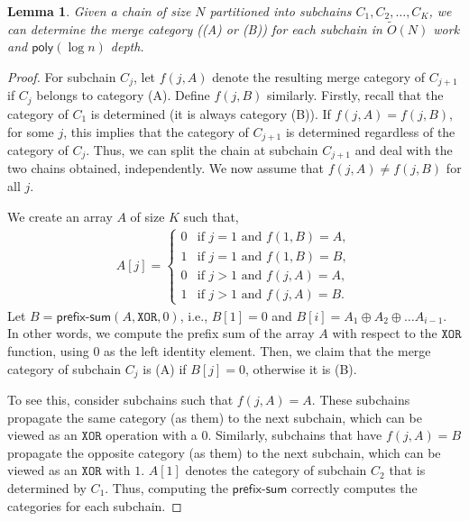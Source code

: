 \documentclass[11pt]{article}
\newcommand{\poly}{\ensuremath{\mathsf{poly}}}
\newtheorem{lemma}{Lemma}
\begin{document}
\begin{lemma}\label{lem:path_prefix_sum}
    Given a chain of size $N$ partitioned into subchains $C_1,C_2,\ldots,C_K$, we can determine the merge category ((A) or (B)) for each subchain in $\tilde{O}(N)$ work and $\poly(\log n)$ depth.
\end{lemma}
\begin{proof}
    For subchain $C_j$, let $f(j,A)$ denote the resulting merge category of $C_{j+1}$ if $C_j$ belongs to category (A). Define $f(j,B)$ similarly. Firstly, recall that the category of $C_1$ is determined (it is always category (B)). 
    If $f(j,A) = f(j,B)$, for some $j$, this implies that the category of $C_{j+1}$ is determined regardless of the category of $C_j$. Thus, we can split the chain at subchain $C_{j+1}$ and deal with the two chains obtained, independently. We now assume that $f(j,A)\ne f(j,B)$ for all $j$.

    We create an array $A$ of size $K$ such that,
    \begin{align*}
        A[j] = \begin{cases}
            0 & \text{if $j=1$ and $f(1,B)=A$},\\
            1 & \text{if $j=1$ and $f(1,B)=B$},\\
            0 & \text{if $j>1$ and $f(j,A)=A$},\\
            1 & \text{if $j>1$ and $f(j,A)=B$}.
        \end{cases} 
    \end{align*}
    Let $B= \mathsf{prefix\text{-}sum}(A,\mathtt{XOR},0)$, i.e., $B[1]=0$ and $B[i]=A_1\oplus A_2 \oplus\ldots A_{i-1}$.
    In other words, we compute the prefix sum of the array $A$ with respect to the $\mathtt{XOR}$ function, using $0$ as the left identity element.
    Then, we claim that the merge category of subchain $C_j$ is (A) if $B[j]=0$, otherwise it is (B).

    To see this, consider subchains such that $f(j,A)=A$. These subchains propagate the same category (as them) to the next subchain, which can be viewed as an $\mathtt{XOR}$ operation with a $0$. Similarly, subchains that have $f(j,A)=B$ propagate the opposite category (as them) to the next subchain, which can be viewed as an $\mathtt{XOR}$ with $1$. $A[1]$ denotes the category of subchain $C_2$ that is determined by $C_1$. Thus, computing the $\mathsf{prefix\text{-}sum}$ correctly computes the categories for each subchain.


\end{proof}
\end{document}
